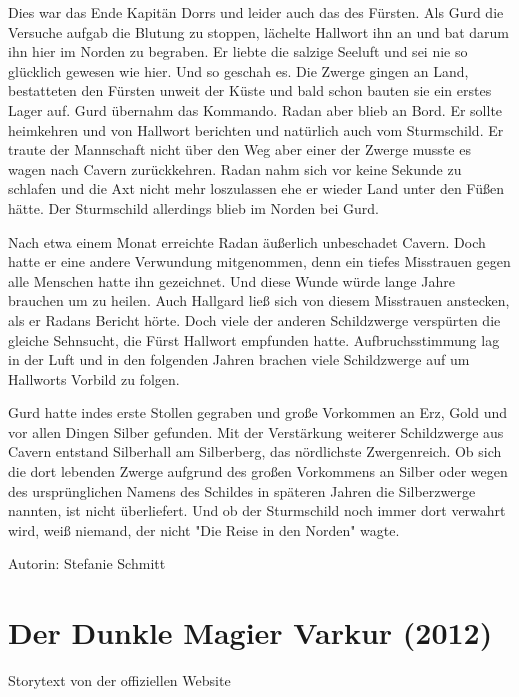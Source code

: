 \documentclass[10pt, a4paper, oneside]{book}
\newcommand{\fillbreak}{\vspace*{\fill}\columnbreak}
\newcommand{\storytext}[1]{%
    \section{#1}%
    \label{Storytext: #1}%
}
\begin{document}
\begin{multicols}{2}
Dies war das Ende Kapitän Dorrs und leider auch das des Fürsten. Als Gurd die Versuche aufgab die Blutung zu stoppen, lächelte Hallwort ihn an und bat darum ihn hier im Norden zu begraben. Er liebte die salzige Seeluft und sei nie so glücklich gewesen wie hier. Und so geschah es. Die Zwerge gingen an Land, bestatteten den Fürsten unweit der Küste und bald schon bauten sie ein erstes Lager auf. Gurd übernahm das Kommando. Radan aber blieb an Bord. Er sollte heimkehren und von Hallwort berichten und natürlich auch vom Sturmschild. Er traute der Mannschaft nicht über den Weg aber einer der Zwerge musste es wagen nach Cavern zurückkehren. Radan nahm sich vor keine Sekunde zu schlafen und die Axt nicht mehr loszulassen ehe er wieder Land unter den Füßen hätte. Der Sturmschild allerdings  blieb im Norden bei Gurd.\bigskip

Nach etwa einem Monat erreichte Radan äußerlich unbeschadet Cavern. Doch hatte er eine andere Verwundung mitgenommen, denn ein tiefes Misstrauen gegen alle Menschen hatte ihn gezeichnet. Und diese Wunde würde lange Jahre brauchen um zu heilen. Auch Hallgard ließ sich von diesem Misstrauen anstecken, als er Radans Bericht hörte. Doch viele der anderen Schildzwerge verspürten die gleiche Sehnsucht, die Fürst Hallwort empfunden hatte. Aufbruchsstimmung lag in der Luft und in den folgenden Jahren brachen viele Schildzwerge auf um Hallworts Vorbild zu folgen.\bigskip

Gurd hatte indes erste Stollen gegraben und große Vorkommen an Erz, Gold und vor allen Dingen Silber gefunden. Mit der Verstärkung weiterer Schildzwerge aus Cavern entstand Silberhall am Silberberg, das nördlichste Zwergenreich. Ob sich die dort lebenden Zwerge aufgrund des großen Vorkommens an Silber oder wegen des ursprünglichen Namens des Schildes in späteren Jahren die Silberzwerge nannten, ist nicht überliefert. Und ob der Sturmschild noch immer dort verwahrt wird, weiß niemand, der nicht "Die Reise in den Norden" wagte.\bigskip

Autorin: Stefanie Schmitt













\fillbreak
\storytext{Der Dunkle Magier Varkur (2012)}

\begin{center}
    Storytext von der offiziellen Website
\end{center}


\end{multicols}
\end{document}
